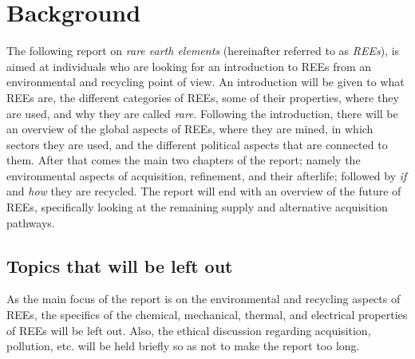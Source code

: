 \section{Background}

The following report on \textit{rare earth elements} (hereinafter referred to as \textit{REEs}), is aimed at individuals who are looking for an introduction to REEs from an environmental and recycling point of view. An introduction will be given to what REEs are, the different categories of REEs, some of their properties, where they are used, and why they are called \textit{rare}. Following the introduction, there will be an overview of the global aspects of REEs, where they are mined, in which sectors they are used, and the different political aspects that are connected to them. After that comes the main two chapters of the report; namely the environmental aspects of acquisition, refinement, and their afterlife; followed by \textit{if} and \textit{how} they are recycled. The report will end with an overview of the future of REEs, specifically looking at the remaining supply and alternative acquisition pathways.

\subsection{Topics that will be left out}

As the main focus of the report is on the environmental and recycling aspects of REEs, the specifics of the chemical, mechanical, thermal, and electrical properties of REEs will be left out. Also, the ethical discussion regarding acquisition, pollution, etc. will be held briefly so as not to make the report too long.